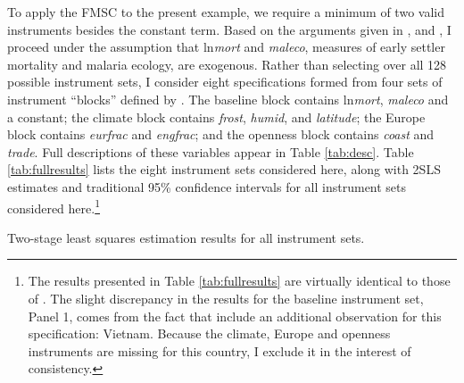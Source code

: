 To apply the FMSC to the present example, we require a minimum of two valid instruments besides the constant term. 
Based on the arguments given in \cite{Acemoglu}, \cite{Carstensen2006} and \cite{Sachs}, I proceed under the assumption that ln\emph{mort} and \emph{maleco}, measures of early settler mortality and malaria ecology, are exogenous.
Rather than selecting over all 128 possible instrument sets, I consider eight specifications formed from four sets of instrument ``blocks'' defined by \cite{Carstensen2006}.
The baseline block contains ln\emph{mort}, \emph{maleco} and a constant; the climate block contains \emph{frost}, \emph{humid}, and \emph{latitude}; the Europe block contains \emph{eurfrac} and \emph{engfrac}; and the openness block contains \emph{coast} and \emph{trade}. 
Full descriptions of these variables appear in Table \ref{tab:desc}.
Table \ref{tab:fullresults} lists the eight instrument sets considered here, along with 2SLS estimates and traditional 95\% confidence intervals for all instrument sets considered here.\footnote{The results presented in Table \ref{tab:fullresults} are virtually identical to those of \cite{Carstensen2006}. The slight discrepancy in the results for the baseline instrument set, Panel 1, comes from the fact that \cite{Carstensen2006} include an additional observation for this specification: Vietnam. Because the climate, Europe and openness instruments are missing for this country, I exclude it in the interest of consistency.}


\begin{table}[h]
\centering

\caption{Two-stage least squares estimation results for all instrument sets.}
\label{tab:fullresults}

\end{table}

